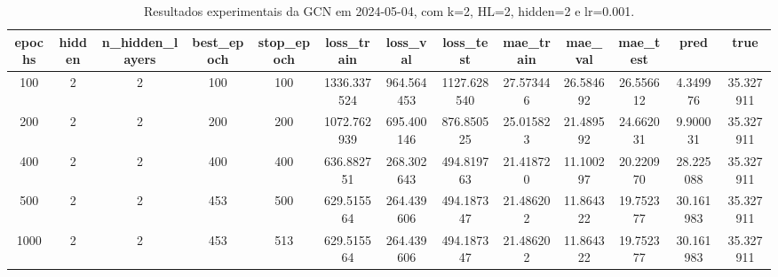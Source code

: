 \begin{table}[h]
\centering
\caption{Resultados experimentais da GCN em 2024-05-04, com k=2, HL=2, hidden=2 e lr=0.001.}
\label{tab:gcn_results_k2_hl2_h2_d20240504}
\begin{tabular}{ccccccccccccc}
\toprule
epochs & hidden & n\_hidden\_layers & best\_epoch & stop\_epoch & loss\_train & loss\_val & loss\_test & mae\_train & mae\_val & mae\_test & pred & true \\
\midrule
100 & 2 & 2 & 100 & 100 & 1336.337524 & 964.564453 & 1127.628540 & 27.573446 & 26.584692 & 26.556612 & 4.349976 & 35.327911 \\
200 & 2 & 2 & 200 & 200 & 1072.762939 & 695.400146 & 876.850525 & 25.015823 & 21.489592 & 24.662031 & 9.900031 & 35.327911 \\
400 & 2 & 2 & 400 & 400 & 636.882751 & 268.302643 & 494.819763 & 21.418720 & 11.100297 & 20.220970 & 28.225088 & 35.327911 \\
500 & 2 & 2 & 453 & 500 & 629.515564 & 264.439606 & 494.187347 & 21.486202 & 11.864322 & 19.752377 & 30.161983 & 35.327911 \\
1000 & 2 & 2 & 453 & 513 & 629.515564 & 264.439606 & 494.187347 & 21.486202 & 11.864322 & 19.752377 & 30.161983 & 35.327911 \\
\bottomrule
\end{tabular}
\end{table}
